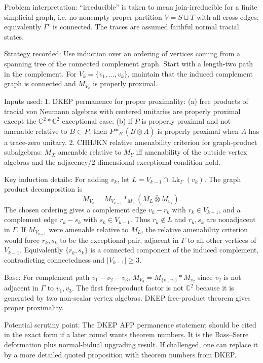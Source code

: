 \documentclass{article}
\begin{document}
Problem interpretation: ``irreducible'' is taken to mean join-irreducible for a
finite simplicial graph, i.e. no nonempty proper partition $V=S\sqcup T$ with
all cross edges; equivalently $\Gamma^c$ is connected.  The traces are assumed
faithful normal tracial states.

Strategy recorded:
Use induction over an ordering of vertices coming from a spanning tree of the
connected complement graph.  Start with a length-two path in the complement.
For $V_k=\{v_1,\ldots,v_k\}$, maintain that the induced complement graph is
connected and $M_{V_k}$ is properly proximal.

Inputs used:
1. DKEP permanence for proper proximality:
   (a) free products of tracial von Neumann algebras with centered unitaries are
       properly proximal except the $\mathbb C^2*\mathbb C^2$ exceptional case;
   (b) if $P$ is properly proximal and not amenable relative to $B\subset P$,
       then $P*_B(B\bar\otimes A)$ is properly proximal when $A$ has a
       trace-zero unitary.
2. CHHJKN relative amenability criterion for graph-product subalgebras:
   $M_X$ amenable relative to $M_Y$ iff amenability of the outside vertex
   algebras and the adjacency/2-dimensional exceptional condition hold.

Key induction details:
For adding $v_k$, let $L=V_{k-1}\cap\operatorname{Lk}_\Gamma(v_k)$.  The graph
product decomposition is
\[
M_{V_k}=M_{V_{k-1}}*_{M_L}(M_L\bar\otimes M_{v_k}).
\]
The chosen ordering gives a complement edge $v_k-r_k$ with $r_k\in V_{k-1}$,
and a complement edge $r_k-s_k$ with $s_k\in V_{k-1}$.  Thus $r_k\notin L$ and
$r_k,s_k$ are nonadjacent in $\Gamma$.  If $M_{V_{k-1}}$ were amenable relative
to $M_L$, the relative amenability criterion would force $r_k,s_k$ to be the
exceptional pair, adjacent in $\Gamma$ to all other vertices of $V_{k-1}$.
Equivalently $\{r_k,s_k\}$ is a connected component of the induced complement,
contradicting connectedness and $|V_{k-1}|\ge3$.

Base:
For complement path $v_1-v_2-v_3$, $M_{V_3}=M_{\{v_1,v_3\}}*M_{v_2}$ since
$v_2$ is not adjacent in $\Gamma$ to $v_1,v_3$.  The first free-product factor
is not $\mathbb C^2$ because it is generated by two non-scalar vertex algebras.
DKEP free-product theorem gives proper proximality.

Potential scrutiny point:
The DKEP AFP permanence statement should be cited in the exact form if a later
round wants theorem numbers.  It is the Bass--Serre deformation plus
normal-bidual upgrading result.  If challenged, one can replace it by a more
detailed quoted proposition with theorem numbers from DKEP.
\end{document}

